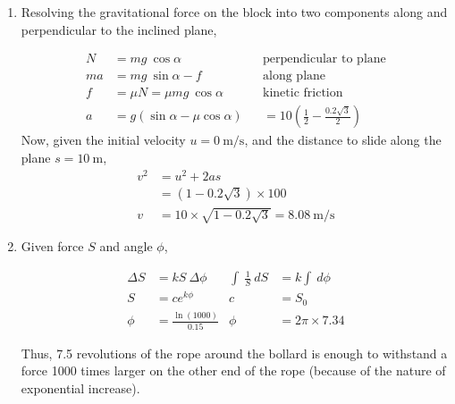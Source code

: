 \begin{enumerate}
    \item Resolving the gravitational force on the block into two components along and
          perpendicular to the inclined plane,

          \begin{align}
              N  & = mg\ \cos \alpha                  &
                 & \text{perpendicular to plane}        \\
              ma & = mg\ \sin \alpha - f              &
                 & \text{along plane}                   \\
              f  & = \mu N = \mu mg\ \cos \alpha      &
                 & \text{kinetic friction}              \\
              a  & = g(\sin \alpha - \mu \cos \alpha)
                 &                                    &
              = 10 \left(\frac{1}{2}
              - \frac{0.2\sqrt{3}}{2}\right)
          \end{align}
          Now, given the initial velocity $ u = \SI{0}{\meter\per\second} $, and the
          distance to slide along the plane $ s = \SI{10}{\meter} $,
          \begin{align}
              v^{2} & = u^{2} + 2as                       \\
                    & = (1 - 0.2 \sqrt{3}) \times 100     \\
              v     & = 10 \times \sqrt{1 - 0.2 \sqrt{3}}
              = \SI{8.08}{\meter\per\second}
          \end{align}


    \item Given force $ S $ and angle $ \phi $,

          \begin{align}
              \Delta S              & = kS\ \Delta \phi         &
              \int\ \frac{1}{S}\ dS & = k \int\ d\phi             \\
              S                     & = ce^{k\phi}              &
              c                     & = S_{0}                     \\
              \phi                  & = \frac{\ln (1000)}{0.15} &
              \phi                  & = 2\pi \times 7.34
          \end{align}

          Thus, 7.5 revolutions of the rope around the bollard is enough to withstand a
          force 1000 times larger on the other end of the rope (because of the nature
          of exponential increase).


\end{enumerate}
